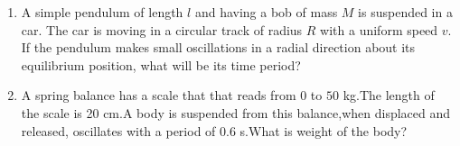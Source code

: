 \begin{enumerate}[label=\thesection.\arabic*,ref=\thesection.\theenumi]
\item A simple pendulum of length $l$ and having a bob of mass $M$ is suspended in a car. The car is moving in a circular track of radius $R$ with a uniform speed $v$. If the pendulum makes small oscillations in a radial direction about its equilibrium position, what will be its time period?
\pagebreak
\item A spring balance has a scale that that reads from $0$ to $50$ kg.The length of the scale is 20 cm.A body is suspended from this balance,when displaced and released, oscillates with a period of 0.6 s.What is weight of the body? 
\pagebreak
\end{enumerate}
